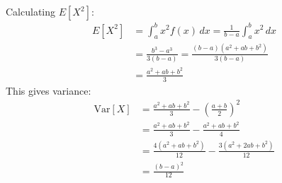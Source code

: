 \documentclass[12pt,a4paper]{report}
\begin{document}
Calculating $E[X^2]$:
\begin{align*}
E[X^2]&=\int_a^b\!x^2f(x)\,dx=\frac{1}{b-a}\int_a^b\!x^2\,dx\\
&=\frac{b^3-a^3}{3(b-a)}=\frac{(b-a)(a^2+ab+b^2)}{3(b-a)}\\
&=\frac{a^2+ab+b^2}{3}
\end{align*}
This gives variance:
\begin{align*}
\text{Var}[X]&=\frac{a^2+ab+b^2}{3}-\left(\frac{a+b}{2}\right)^2\\
&=\frac{a^2+ab+b^2}{3}-\frac{a^2+ab+b^2}{4}\\
&=\frac{4(a^2+ab+b^2)}{12}-\frac{3(a^2+2ab+b^2)}{12}\\
&=\frac{(b-a)^2}{12}
\end{align*}
\end{document}
